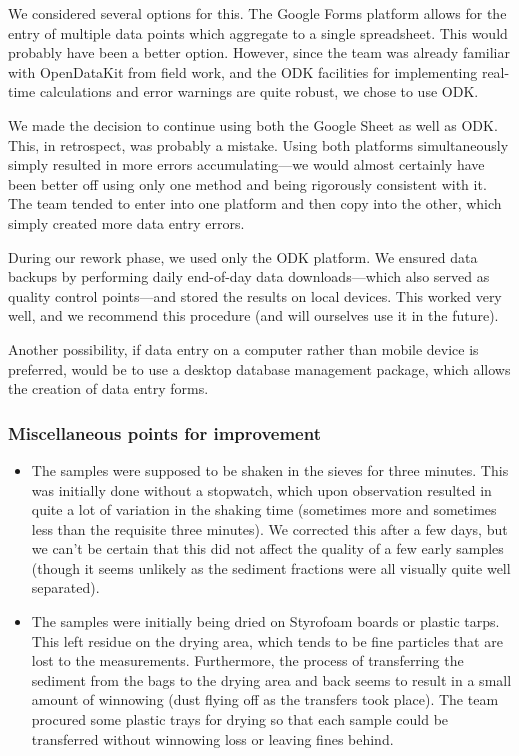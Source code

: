 \documentclass[a4paper,12pt,twoside]{article}
\begin{document}
We considered several options for this. The Google Forms platform allows for the entry of multiple data points which aggregate to a single spreadsheet. This would probably have been a better option. However, since the team was already familiar with OpenDataKit from field work, and the ODK facilities for implementing real-time calculations and error warnings are quite robust, we chose to use ODK.

We made the decision to continue using both the Google Sheet as well as ODK. This, in retrospect, was probably a mistake. Using both platforms simultaneously simply resulted in more errors accumulating---we would almost certainly have been better off using only one method and being rigorously consistent with it. The team tended to enter into one platform and then copy into the other, which simply created more data entry errors.

During our rework phase, we used only the ODK platform. We ensured data backups by performing daily end-of-day data downloads---which also served as quality control points---and stored the results on local devices. This worked very well, and we recommend this procedure (and will ourselves use it in the future).

Another possibility, if data entry on a computer rather than mobile device is preferred, would be to use a desktop database management package, which allows the creation of data entry forms.

\color{RHblue}
\subsubsection{Miscellaneous points for improvement}
\color{RHgrey}
\begin{itemize}
  \item The samples were supposed to be shaken in the sieves for three minutes. This was initially done without a stopwatch, which upon observation resulted in quite a lot of variation in the shaking time (sometimes more and sometimes less than the requisite three minutes). We corrected this after a few days, but we can't be certain that this did not affect the quality of a few early samples (though it seems unlikely as the sediment fractions were all visually quite well separated).
  \item The samples were initially being dried on Styrofoam boards or plastic tarps. This left residue on the drying area, which tends to be fine particles that are lost to the measurements. Furthermore, the process of transferring the sediment from the bags to the drying area and back seems to result in a small amount of winnowing (dust flying off as the transfers took place). The team procured some plastic trays for drying so that each sample could be transferred without winnowing loss or leaving fines behind.
\end{itemize}
\end{document}
